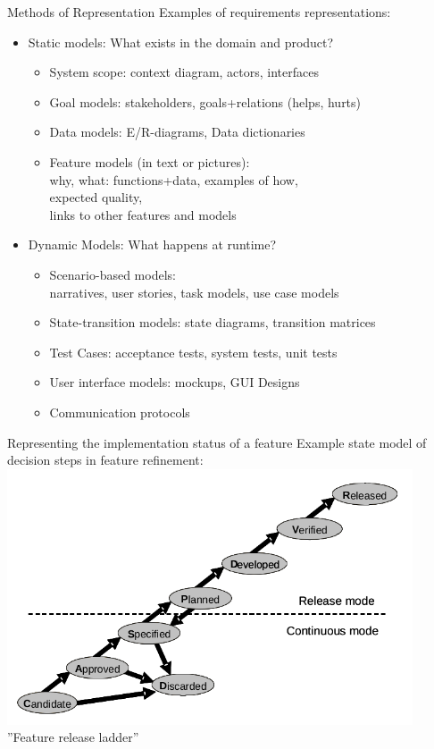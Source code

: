 \documentclass{beamer}
\begin{document}
\begin{frame}[fragile]{Methods of Representation}
Examples of requirements representations:
\begin{itemize}
\item Static models: What exists in the domain and product?
\begin{itemize}
\item System scope: context diagram, actors, interfaces
\item Goal models: stakeholders, goals+relations (helps, hurts)
\item Data models: E/R-diagrams, Data dictionaries
\item Feature models (in text or pictures):\\why, what: functions+data, examples of how,\\expected quality,\\links to other features and models
\end{itemize}
\item Dynamic Models: What happens at runtime?
\begin{itemize}
\item Scenario-based models:\\narratives, user stories, task models, use case models
\item State-transition models: state diagrams, transition matrices
\item Test Cases: acceptance tests, system tests, unit tests
\item User interface models: mockups, GUI Designs
\item Communication protocols
\end{itemize}
\end{itemize}
\end{frame}

\begin{frame}[fragile]{Representing the implementation status of a feature}
Example state model of decision steps in feature refinement:
\includegraphics[width=0.9\textwidth]{img/ladder}
''Feature release ladder''
\end{frame}



    
\end{document}
